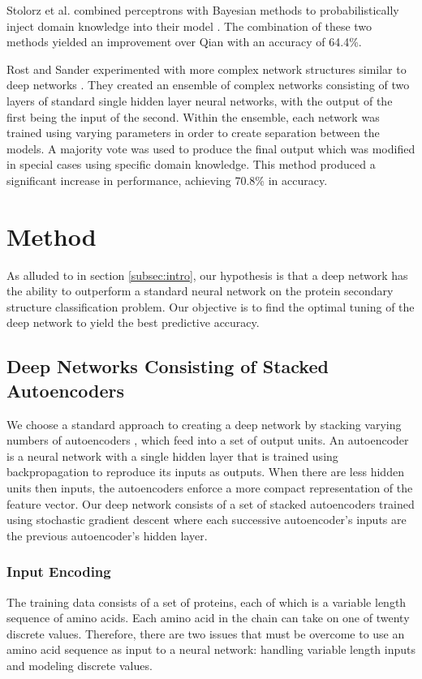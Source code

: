 \documentclass[letterpaper,twocolumn,12pt]{article}
\begin{document}
Stolorz et al. combined perceptrons with Bayesian methods to probabilistically inject domain knowledge into their model \cite{Stolorz}.
The combination of these two methods yielded an improvement over Qian with an accuracy of 64.4\%.

Rost and Sander experimented with more complex network structures similar to deep networks \cite{Rost}.
They created an ensemble of complex networks consisting of two layers of standard single hidden layer neural networks, with the output of the first being the input of the second.
Within the ensemble, each network was trained using varying parameters in order to create separation between the models.
A majority vote was used to produce the final output which was modified in special cases using specific domain knowledge.
This method produced a significant increase in performance, achieving 70.8\% in accuracy.

\section{Method}
As alluded to in section \ref{subsec:intro}, our hypothesis is that a deep network has the ability to outperform a standard neural network on the protein secondary structure classification
problem.
Our objective is to find the optimal tuning of the deep network to yield the best predictive accuracy.

\subsection{Deep Networks Consisting of Stacked Autoencoders}
We choose a standard approach to creating a deep network by stacking varying numbers of autoencoders \cite{Hinton}, which feed into a set of output units.
An autoencoder is a neural network with a single hidden layer that is trained using backpropagation to reproduce its inputs as outputs.
When there are less hidden units then inputs, the autoencoders enforce a more compact representation of the feature vector.
Our deep network consists of a set of stacked autoencoders trained using stochastic gradient descent where each successive autoencoder's inputs are the previous autoencoder's hidden layer.

\subsubsection{Input Encoding}
The training data consists of a set of proteins, each of which is a variable length sequence of amino acids.
Each amino acid in the chain can take on one of twenty discrete values.
Therefore, there are two issues that must be overcome to use an amino acid sequence as input to a neural network: handling variable length inputs and modeling discrete values.
\end{document}
